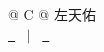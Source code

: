 
\begin{tabularx}{\linewidth}{@{} C @{}}
\Huge{左天佑} \\[7.5pt]
\href{mailto:\Email}{\raisebox{-0.05\height}\faEnvelope \ \Email} \ $|$ \ 
\href{\PhoneHref}{\raisebox{-0.05\height}\faMobile \ \PhoneDisplay} \\
\end{tabularx}
